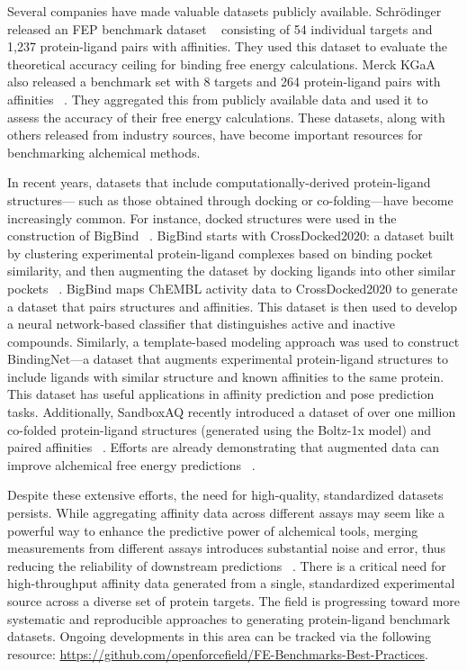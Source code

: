 \documentclass[9pt,bestpractices,pubversion]{livecoms}
\begin{document}
Several companies have made valuable datasets publicly available. Schr\"{o}dinger released an FEP benchmark dataset ~\cite{ross_maximal_2023} consisting of 54 individual targets and 1,237 protein-ligand pairs with affinities.  They used this dataset to evaluate the theoretical accuracy ceiling for binding free energy calculations. Merck KGaA also released a benchmark set with 8 targets and 264 protein-ligand pairs with affinities ~\cite{schindler_large-scale_2020}. They aggregated this from publicly available data and used it to assess the accuracy of their free energy calculations. These datasets, along with others released from industry sources, have become important resources for benchmarking alchemical methods. 

In recent years, datasets that include computationally-derived protein-ligand structures— such as those obtained through docking or co-folding—have become increasingly common. For instance, docked structures were used in the construction of BigBind ~\cite{brocidiacono_bigbind_2024}. BigBind starts with CrossDocked2020: a dataset built by clustering experimental protein-ligand complexes based on binding pocket similarity, and then augmenting the dataset by docking ligands into other similar pockets ~\cite{francoeur_three-dimensional_2020}. BigBind maps ChEMBL activity data to CrossDocked2020 to generate a dataset that pairs structures and affinities. This dataset is then used to develop a neural network-based classifier that distinguishes active and inactive compounds. Similarly, a template-based modeling approach was used to construct BindingNet—a dataset that augments experimental protein-ligand structures to include ligands with similar structure and known affinities to the same protein. This dataset has useful applications in affinity prediction and pose prediction tasks. Additionally, SandboxAQ recently introduced a dataset of over one million co-folded protein-ligand structures (generated using the Boltz-1x model) and paired affinities ~\cite{lemos_sair_2025}. Efforts are already demonstrating that augmented data can improve alchemical free energy predictions ~\cite{valsson_narrowing_2025}. 

Despite these extensive efforts, the need for high-quality, standardized datasets persists. While aggregating affinity data across different assays may seem like a powerful way to enhance the predictive power of alchemical tools, merging measurements from different assays introduces substantial noise and error, thus reducing the reliability of downstream predictions ~\cite{landrum_combining_2024}. There is a critical need for high-throughput affinity data generated from a single, standardized experimental source across a diverse set of protein targets. The field is progressing toward more systematic and reproducible approaches to generating protein-ligand benchmark datasets. Ongoing developments in this area can be tracked via the following resource: \url{https://github.com/openforcefield/FE-Benchmarks-Best-Practices}.
\end{document}
